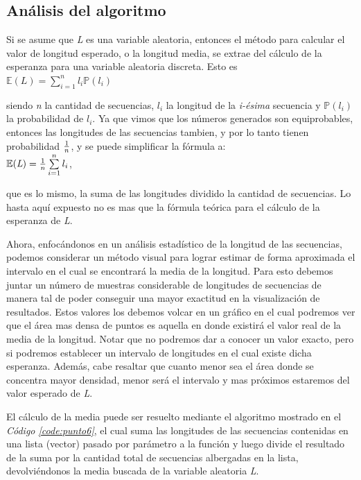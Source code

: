 \documentclass{article}
\newcommand{\refcode}[1]{\textit{Código \ref{#1}}}
\begin{document}

\bigskip



\subsection{Análisis del algoritmo}

	Si se asume que \textit{L} es una variable aleatoria, entonces el método para calcular el valor de longitud esperado, o la longitud media, se extrae del cálculo de la esperanza para una variable aleatoria discreta. Esto es\\
	 
$\mathbb{E}(\textit{L}) = \sum\limits_{i=1}^n l_{i} \mathbb{P}(l_{i}) $

\bigskip
\noindent siendo \textit{n} la cantidad de secuencias, \textit{$l_i$} la longitud de la \textit{i-ésima} secuencia y \textit{$\mathbb{P}(l_i)$} la probabilidad de \textit{$l_i$}. Ya que vimos que los números generados son equiprobables, entonces las longitudes de las secuencias tambien, y por lo tanto tienen probabilidad $1 \over n$, y se puede simplificar la fórmula a:\\

$\mathbb{E}(\textit{L}) = {1 \over n} \sum\limits_{i=1}^n l_{i} $,

\bigskip
\noindent que es lo mismo, la suma de las longitudes dividido la cantidad de secuencias. Lo hasta aquí expuesto no es mas que la fórmula teórica para el cálculo de la esperanza de \textit{L}.
	\par
	Ahora, enfocándonos en un análisis estadístico de la longitud de las secuencias, podemos considerar un método visual para lograr estimar de forma aproximada el intervalo en el cual se encontrará la media de la longitud. Para esto debemos juntar un número de muestras considerable de longitudes de secuencias de manera tal de poder conseguir una mayor exactitud en la visualización de resultados. Estos valores los debemos volcar en un gráfico en el cual podremos ver que el área mas densa de puntos es aquella en donde existirá el valor real de la media de la longitud. Notar que no podremos dar a conocer un valor exacto, pero si podremos establecer un intervalo de longitudes en el cual existe dicha esperanza. Además, cabe resaltar que cuanto menor sea el área donde se concentra mayor densidad, menor será el intervalo y mas próximos estaremos del valor esperado de \textit{L}.
	\par
	El cálculo de la media puede ser resuelto mediante el algoritmo mostrado en el \refcode{code:punto6}, el cual suma las longitudes de las secuencias contenidas en una lista (vector) pasado por parámetro a la función y luego divide el resultado de la suma por la cantidad total de secuencias albergadas en la lista, devolviéndonos la media buscada de la variable aleatoria \textit{L}.\medskip
\end{document}
